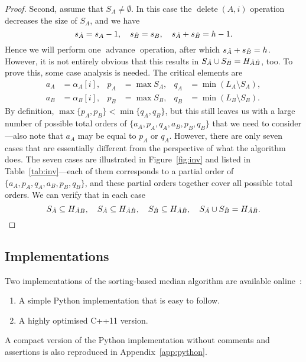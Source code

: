 \documentclass[a4paper,11pt]{article}
\DeclareMathOperator{\Delete}{delete}
\DeclareMathOperator{\Advance}{advance}
\newcommand{\mydot}[1]{\smash{\dot{#1}}}
\newcommand{\myddot}[1]{\smash{\ddot{#1}}}
\begin{document}
\begin{proof}
    Second, assume that $S_A \ne \emptyset$. In this case the $\Delete(A,i)$ operation decreases the size of $S_A$, and we have
    \[
        s_{\mydot A} = s_A - 1, \quad
        s_{\mydot B} = s_B, \quad
        s_{\mydot A} + s_{\mydot B} = h - 1.
    \]
    Hence we will perform one $\Advance$ operation, after which $s_{\myddot A} + s_{\myddot B} = h$. However, it is not entirely obvious that this results in $S_{\myddot A} \cup S_{\myddot B} = H_{\myddot A \myddot B}$, too. To prove this, some case analysis is needed. The critical elements are
    \begin{align*}
        a_A &= \alpha_A[i], &
        p_A &= \max S_A, &
        q_A &= \min (L_A \setminus S_A), \\
        a_B &= \alpha_B[i], &
        p_B &= \max S_B, &
        q_B &= \min (L_B \setminus S_B).
    \end{align*}
    By definition, $\max\{p_A,p_B\} < \min\{q_A,q_B\}$, but this still leaves us with a large number of possible total orders of $\{a_A,p_A,q_A,a_B,p_B,q_B\}$ that we need to consider---also note that $a_A$ may be equal to $p_A$ or $q_A$. However, there are only seven cases that are essentially different from the perspective of what the algorithm does. The seven cases are illustrated in Figure~\ref{fig:inv} and listed in Table~\ref{tab:inv}---each of them corresponds to a partial order of $\{a_A,p_A,q_A,a_B,p_B,q_B\}$, and these partial orders together cover all possible total orders. We can verify that in each case
    \[
        S_{\mydot A} \subseteq H_{\mydot A B}, \quad
        S_{\mydot A} \subseteq H_{\mydot A \mydot B}, \quad
        S_{\mydot B} \subseteq H_{\mydot A \mydot B}, \quad
        S_{\myddot A} \cup S_{\myddot B} = H_{\myddot A \myddot B}.
        \qedhere
    \]
\end{proof}


\subsection{Implementations}

Two implementations of the sorting-based median algorithm are available online~:
\begin{enumerate}[noitemsep]
    \item A simple Python implementation that is easy to follow.
    \item A highly optimised C++11 version.
\end{enumerate}
A compact version of the Python implementation without comments and assertions is also reproduced in Appendix~\ref{app:python}.
\end{document}
